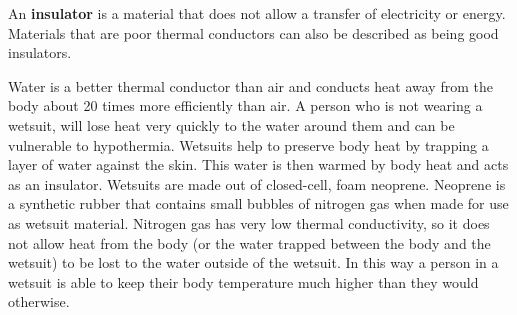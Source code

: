 An \textbf{insulator} is a material that does not allow a transfer of electricity or energy. Materials that are poor thermal conductors can also be described as being good insulators.\\

\begin{IFact}{Water is a better thermal conductor than air and conducts heat away from the body about 20 times more efficiently than air. A person who is not wearing a wetsuit, will lose heat very quickly to the water around them and can be vulnerable to hypothermia. Wetsuits help to preserve body heat by trapping a layer of water against the skin. This water is then warmed by body heat and acts as an insulator.  Wetsuits are made out of closed-cell, foam neoprene. Neoprene is a synthetic rubber that contains small bubbles of nitrogen gas when made for use as wetsuit material. Nitrogen gas has very low thermal conductivity, so it does not allow heat from the body (or the water trapped between the body and the wetsuit) to be lost to the water outside of the wetsuit. In this way a person in a wetsuit is able to keep their body temperature much higher than they would otherwise.
}
\end{IFact}

